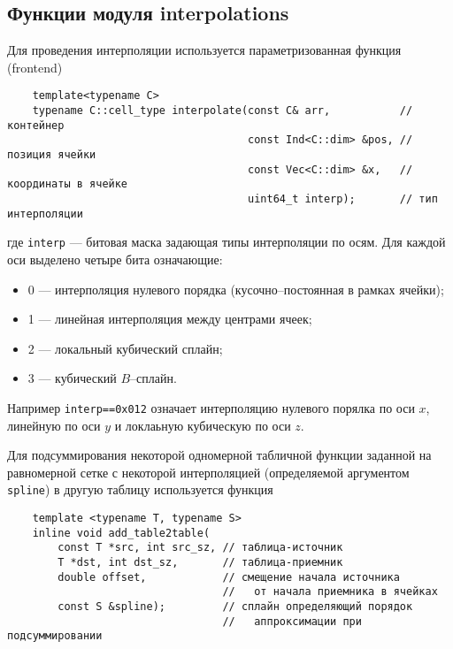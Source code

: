 \subsection{Функции модуля {\sf interpolations}}
Для проведения интерполяции используется параметризованная функция (frontend)
\begin{verbatim}
    template<typename C>
    typename C::cell_type interpolate(const C& arr,           // контейнер
                                      const Ind<C::dim> &pos, // позиция ячейки
                                      const Vec<C::dim> &x,   // координаты в ячейке
                                      uint64_t interp);       // тип интерполяции
\end{verbatim}
где \verb'interp' --- битовая маска задающая типы интерполяции по
осям. Для каждой оси выделено четыре бита означающие:
\begin{itemize}
  \item 0 --- интерполяция нулевого порядка (кусочно--постоянная в
    рамках ячейки);
  \item 1 --- линейная интерполяция между центрами ячеек;
  \item 2 --- локальный кубический сплайн;
  \item 3 --- кубический $B$--сплайн.
\end{itemize}
Например \verb'interp==0x012' означает интерполяцию нулевого порялка
по оси $x$, линейную по оси $y$ и локлаьную кубическую по оси $z$. 


Для подсуммирования некоторой одномерной табличной функции заданной на
равномерной сетке с некоторой интерполяцией (определяемой аргументом \verb'spline') в другую таблицу
используется функция
\begin{verbatim}
    template <typename T, typename S>
    inline void add_table2table(
        const T *src, int src_sz, // таблица-источник
        T *dst, int dst_sz,       // таблица-приемник
        double offset,            // смещение начала источника 
                                  //   от начала приемника в ячейках
        const S &spline);         // сплайн определяющий порядок 
                                  //   аппроксимации при подсуммировании
\end{verbatim}

